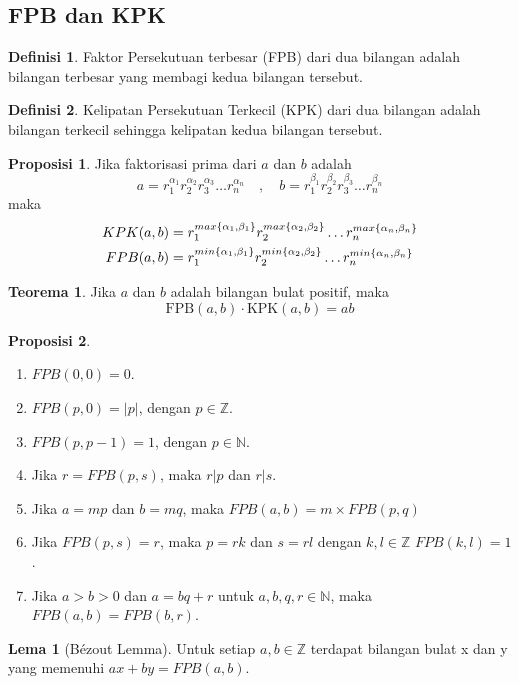 \documentclass[aspectratio=169]{beamer}
\theoremstyle{definition}
\newtheorem{definisi}{Definisi}
\newtheorem{proposisi}{Proposisi}
\newtheorem{teorema}{Teorema}
\newtheorem{lema}{Lema}
\begin{document}
\subsection{FPB dan KPK}
\begin{frame}{\insertsection}{\insertsubsection}
  \begin{definisi}
    Faktor Persekutuan terbesar (FPB) dari dua bilangan adalah bilangan terbesar yang membagi kedua bilangan tersebut.
  \end{definisi}
  \begin{definisi}
    Kelipatan Persekutuan Terkecil (KPK) dari dua bilangan adalah bilangan terkecil sehingga kelipatan kedua bilangan tersebut.
  \end{definisi}
\end{frame}
\begin{frame}{\insertsection}{\insertsubsection}
  \begin{proposisi}
    Jika faktorisasi prima dari $a$ dan $b$ adalah
    \[
      a=r_1^{\alpha_1}r_2^{\alpha_2}r_3^{\alpha_3}\ldots r_n^{\alpha_n}\quad,\quad
      b=r_1^{\beta_1}r_2^{\beta_2}r_3^{\beta_3}\ldots r_n^{\beta_n}
    \]
    maka
    \begin{align}
      KPK(a,b) & =r_1^{max\{\alpha_1,\beta_1\}}r_2^{max\{\alpha_2,\beta_2\}}\ldots r_n^{max\{\alpha_n,\beta_n\}} \notag  \\
      FPB(a,b) & = r_1^{min\{\alpha_1,\beta_1\}}r_2^{min\{\alpha_2,\beta_2\}}\ldots r_n^{min\{\alpha_n,\beta_n\}} \notag
    \end{align}
  \end{proposisi}
  \begin{teorema}
    Jika $a$ dan $b$ adalah bilangan bulat positif, maka
    \[\text{FPB}(a,b)\cdot \text{KPK}(a,b)=ab\]
  \end{teorema}
\end{frame}
\begin{frame}{\insertsection}{\insertsubsection}
  \begin{proposisi}
    \begin{enumerate}
      \item $FPB(0,0)=0$.
      \item $FPB(p,0)=|p|$, dengan $p \in \mathbb{Z}$.
      \item $FPB(p,p-1)=1$, dengan $p \in \mathbb{N}$.
      \item Jika $r=FPB(p,s)$, maka $r|p$ dan $r|s$.
      \item Jika $a=mp$ dan $b=mq$, maka $FPB(a,b)=m \times FPB(p,q)$
      \item Jika $FPB(p,s)=r$, maka $p=rk$ dan $s=rl$ dengan $k,l \in \mathbb{Z}$ $FPB(k,l)=1$.
      \item Jika $a>b>0$ dan $a=bq+r$ untuk $a,b,q,r \in  \mathbb{N}$, maka $FPB(a,b)=FPB(b,r)$.
    \end{enumerate}
  \end{proposisi}
  \begin{lema}[Bézout Lemma]
    Untuk setiap $a,b \in \mathbb{Z}$ terdapat bilangan bulat x dan y yang memenuhi $ax + by = FPB(a, b).$
  \end{lema}
\end{frame}
\end{document}
